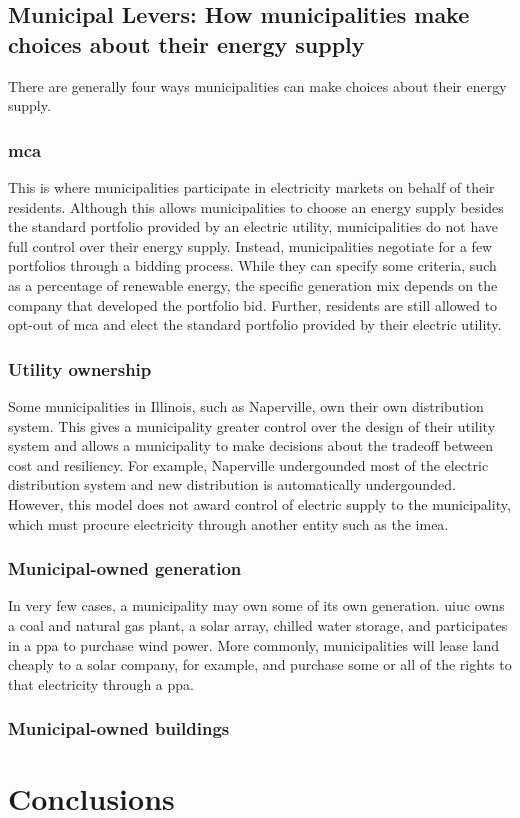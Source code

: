 \section{Municipal Levers: How municipalities make choices about their energy supply}
There are generally four ways municipalities can make choices about their energy supply.

\subsection{\ac{mca}}
This is where municipalities participate in electricity markets on behalf of
their residents. Although this allows municipalities to choose an energy supply
besides the standard portfolio provided by an electric utility, municipalities
do not have full control over their energy supply. Instead, municipalities
negotiate for a few portfolios through a bidding process. While they can specify
some criteria, such as a percentage of renewable energy, the specific generation
mix depends on the company that developed the portfolio bid. Further, residents
are still allowed to opt-out of \ac{mca} and elect the standard portfolio
provided by their electric utility.

\subsection{Utility ownership}
Some municipalities in Illinois, such as Naperville, own their own distribution
system. This gives a municipality greater control over the design of their
utility system and allows a municipality to make decisions about the tradeoff
between cost and resiliency. For example, Naperville undergounded most of the
electric distribution system and new distribution is automatically undergounded.
However, this model does not award control of electric supply to the
municipality, which must procure electricity through another entity such as the
\acf{imea}.

\subsection{Municipal-owned generation}
In very few cases, a municipality may own some of its own generation. \ac{uiuc}
owns a coal and natural gas plant, a solar array, chilled water storage, and
participates in a \ac{ppa} to purchase wind power. More commonly, municipalities
will lease land cheaply to a solar company, for example, and purchase some or all
of the rights to that electricity through a \ac{ppa}. 

\subsection{Municipal-owned buildings}

\fi

\chapter{Conclusions}
